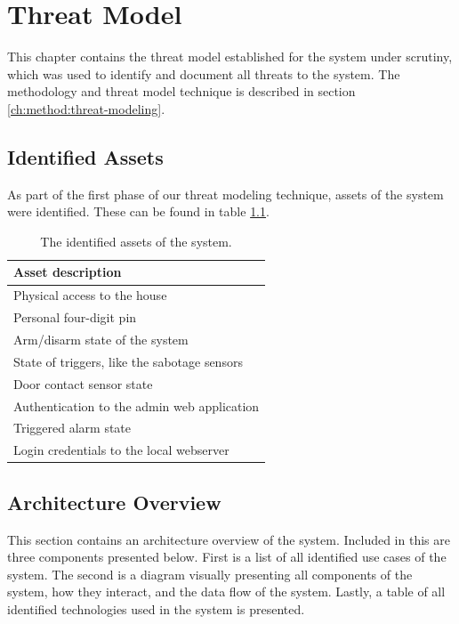 \chapter{Threat Model} \label{ch:threat-model}
This chapter contains the threat model established for the system under scrutiny, which was used to identify and document all threats to the system. The methodology and threat model technique is described in section \ref{ch:method:threat-modeling}.

\section{Identified Assets}
As part of the first phase of our threat modeling technique, assets of the system were identified. These can be found in table \ref{tb:assets}.
\begin{table}[!ht]
    \centering
    \begin{tabular}{l}
        \hline
        \textbf{Asset description}
        \\ \hline
        Physical access to the house
        \\
        Personal four-digit pin
        \\
        Arm/disarm state of the system
        \\
        State of triggers, like the sabotage sensors
        \\
        Door contact sensor state
        \\
        Authentication to the admin web application
        \\
        Triggered alarm state
        \\
        Login credentials to the local webserver
        \\ \hline
    \end{tabular}
    \caption{The identified assets of the system.}
    \label{tb:assets}
\end{table}

\section{Architecture Overview}
This section contains an architecture overview of the system. Included in this are three components presented below. First is a list of all identified use cases of the system. The second is a diagram visually presenting all components of the system, how they interact, and the data flow of the system. Lastly, a table of all identified technologies used in the system is presented.

